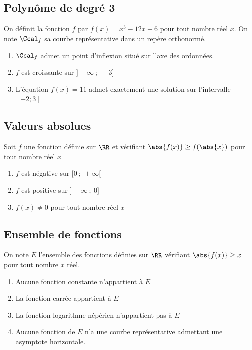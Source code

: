 \documentclass[oneside,12pt]{article}
\begin{document}
\subsection{Polynôme de degré 3}
On définit la fonction $f$ par $f(x)=x^3-12x+6$ pour tout nombre réel $x$.  On note $\Ccal_f$ sa courbe représentative dans un repère orthonormé.
\begin{enumerate}
	\item $\Ccal_f$ admet un point d'inflexion situé sur l'axe des ordonnées.
	\item $f$ est croissante sur $]-\infty~;~-3]$
	\item L'équation $f(x)=11$ admet exactement une solution sur l'intervalle $[-2;3]$
\end{enumerate}



\subsection{Valeurs absolues}
Soit $f$ une fonction définie sur $\RR$ et vérifiant $\abs{f(x)}\geq f(\abs{x})$ pour tout nombre réel $x$
\begin{enumerate}
	\item $f$ est négative sur $[0~;~+\infty[$
	\item $f$ est positive sur $]-\infty~;~0]$
	\item $f(x)\neq0$ pour tout nombre réel $x$
\end{enumerate}



\subsection{Ensemble de fonctions}
On note $E$ l'ensemble des fonctions définies sur $\RR$ vérifiant $\abs{f(x)}\geq x$ pour tout nombre $x$ réel.
\begin{enumerate}
	\item Aucune fonction constante n'appartient à $E$
	\item La fonction carrée appartient à $E$
	\item La fonction logarithme népérien n'appartient pas à $E$
	\item Aucune fonction de $E$ n'a une courbe représentative admettant une asymptote horizontale.
\end{enumerate}
\end{document}
